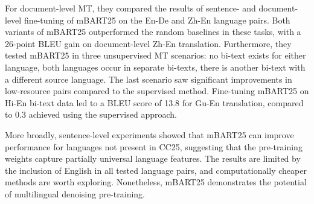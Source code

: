 \documentclass[11pt]{article}
\begin{document}
For document-level MT, they compared the results of sentence- and document-level 
fine-tuning of mBART25 on the En-De and Zh-En language pairs. Both variants of mBART25 
outperformed the random baselines in these tasks, 
with a 26-point BLEU gain on document-level Zh-En 
translation. Furthermore, they tested mBART25 in three unsupervised MT scenarios: no bi-text exists for either language, 
both languages occur in separate bi-texts, there is another bi-text with a different source language. The last scenario saw
significant improvements in low-resource pairs compared to the supervised method. Fine-tuning
mBART25 on Hi-En bi-text data led to a BLEU score of 13.8 for Gu-En translation, compared to 0.3 achieved using the supervised approach.

More broadly, sentence-level experiments showed that mBART25 can improve performance for languages not present in CC25, 
suggesting that the pre-training weights capture partially universal language features. The results are limited by the 
inclusion of English in all tested language pairs, and computationally cheaper methods are worth exploring. Nonetheless, 
mBART25 demonstrates the potential of multilingual denoising pre-training.
\end{document}
